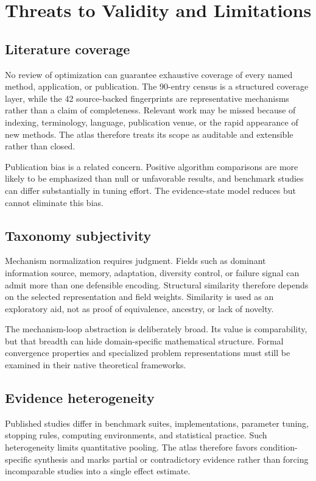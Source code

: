 \section{Threats to Validity and Limitations}
\label{sec:limitations}

\subsection{Literature coverage}

No review of optimization can guarantee exhaustive coverage of every named method, application, or publication. The 90-entry census is a structured coverage layer, while the 42 source-backed fingerprints are representative mechanisms rather than a claim of completeness. Relevant work may be missed because of indexing, terminology, language, publication venue, or the rapid appearance of new methods. The atlas therefore treats its scope as auditable and extensible rather than closed.

Publication bias is a related concern. Positive algorithm comparisons are more likely to be emphasized than null or unfavorable results, and benchmark studies can differ substantially in tuning effort. The evidence-state model reduces but cannot eliminate this bias.

\subsection{Taxonomy subjectivity}

Mechanism normalization requires judgment. Fields such as dominant information source, memory, adaptation, diversity control, or failure signal can admit more than one defensible encoding. Structural similarity therefore depends on the selected representation and field weights. Similarity is used as an exploratory aid, not as proof of equivalence, ancestry, or lack of novelty.

The mechanism-loop abstraction is deliberately broad. Its value is comparability, but that breadth can hide domain-specific mathematical structure. Formal convergence properties and specialized problem representations must still be examined in their native theoretical frameworks.

\subsection{Evidence heterogeneity}

Published studies differ in benchmark suites, implementations, parameter tuning, stopping rules, computing environments, and statistical practice. Such heterogeneity limits quantitative pooling. The atlas therefore favors condition-specific synthesis and marks partial or contradictory evidence rather than forcing incomparable studies into a single effect estimate.

